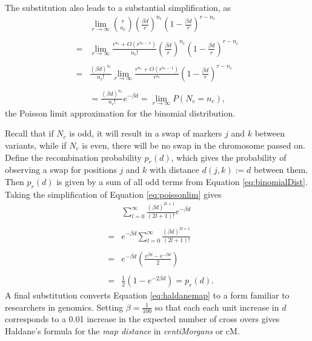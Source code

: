 \documentclass[sts]{imsart}
\begin{document}
The substitution also leads to a substantial simplification, as
\begin{eqnarray} \label{eq:poissonlim}
  & \lim_{r \rightarrow \infty} {r \choose n_c} \left ( \frac{\beta d}{r} \right )^{n_c} \left ( 1-\frac{\beta d}{r} \right )^{r - n_c} \nonumber\\
  &  \nonumber \\
  = & \lim_{r \rightarrow \infty} \frac{r^{n_c} + O(r^{n_c-1})}{n_c!} \left ( \frac{\beta d}{r} \right )^{n_c} \left ( 1-\frac{\beta d}{r} \right )^{r - n_c} \nonumber\\
  & \nonumber \\
  = & \frac{(\beta d)^{n_c}}{n_c!} \lim_{r \rightarrow \infty} \frac{r^{n_c} + O(r^{n_c-1})}{r^{n_c}} \left ( 1-\frac{\beta d}{r} \right )^{r - n_c} \nonumber\\
  & \nonumber \\
  & = \frac{(\beta d)^{n_c}}{n_c!} e^{-\beta d} = \lim_{r \rightarrow \infty} P(N_c = n_c),
\end{eqnarray}
\noindent the Poisson limit approximation for the binomial distribution.

Recall that if $N_c$ is odd, it will result in a swap of markers $j$ and $k$ between variants, while if $N_c$ is even, there will be no swap in the chromosome passed on. Define the recombination probability $p_r(d)$, which gives the probability of observing a swap for positions $j$ and $k$ with distance $d(j,k) := d$ between them. Then $p_r(d)$ is given by a sum of all odd terms from Equation \ref{eq:binomialDist}. Taking the simplification of Equation \ref{eq:poissonlim} gives
\begin{eqnarray} 
  & & \sum_{l = 0}^{\infty} \frac{(\beta d)^{2l + 1}}{(2l + 1)!} e^{-\beta d} \nonumber \\
  & & \nonumber \\
  & = & e^{-\beta d} \sum_{l = 0}^{\infty} \frac{(\beta d)^{2l + 1}}{(2l + 1)!}  \nonumber \\
  & & \nonumber \\
  & = & e^{-\beta d} \left ( \frac{e^{\beta d} - e^{- \beta d}}{2} \right ) \nonumber \\
  & & \nonumber \\
  & = & \frac{1}{2} \left ( 1 - e^{-2 \beta d} \right ) = p_r(d). \label{eq:haldanemap}
\end{eqnarray}
A final substitution converts Equation \ref{eq:haldanemap} to a form familiar to researchers in genomics. Setting $\beta = \frac{1}{100}$ so that each each unit increase in $d$ corresponds to a 0.01 increase in the expected number of cross overs gives Haldane's formula for the \textit{map distance} in \textit{centiMorgans} or cM.
\end{document}
